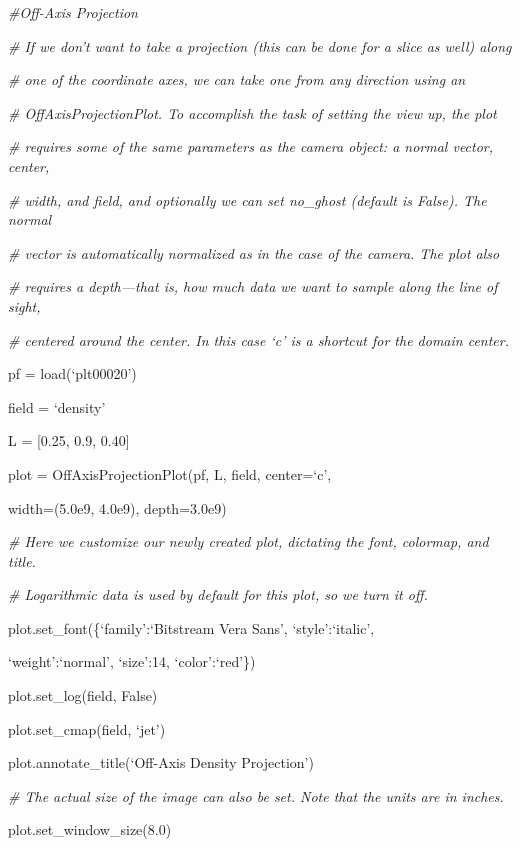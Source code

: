 {\it\#Off-Axis Projection}
{\setlength{\parskip}{0pt}

{\it\# If we don't want to take a projection (this can be done for a slice as well) along}

{\it\# one of the coordinate axes, we can take one from any direction using an}

{\it\# OffAxisProjectionPlot. To accomplish the task of setting the view up, the plot}

{\it\# requires some of the same parameters as the camera object: a normal vector, center,}

{\it\# width, and field, and optionally we can set no\_ghost (default is False). The normal}

{\it\# vector is automatically normalized as in the case of the camera. The plot also}

{\it\# requires a depth---that is, how much data we want to sample along the line of sight,}

{\it\# centered around the center. In this case `c' is a shortcut for the domain center.}

pf = load(`plt00020')
}

field = `density'

L = [0.25, 0.9, 0.40]

plot = OffAxisProjectionPlot(pf, L, field, center=`c',

{\setlength{\parindent}{146pt}width=(5.0e9, 4.0e9), depth=3.0e9)}

{\it\# Here we customize our newly created plot, dictating the font, colormap, and title.}
{\setlength{\parskip}{0pt}

{\it\# Logarithmic data is used by default for this plot, so we turn it off.}

plot.set\_font(\{`family':`Bitstream Vera Sans', `style':`italic',
}

{\setlength{\parindent}{63.5pt}`weight':`normal', `size':14, `color':`red'\})}

plot.set\_log(field, False)

plot.set\_cmap(field, `jet')

plot.annotate\_title(`Off-Axis Density Projection')

{\it\# The actual size of the image can also be set. Note that the units are in inches.}
{\setlength{\parskip}{0pt}

plot.set\_window\_size(8.0)
}

